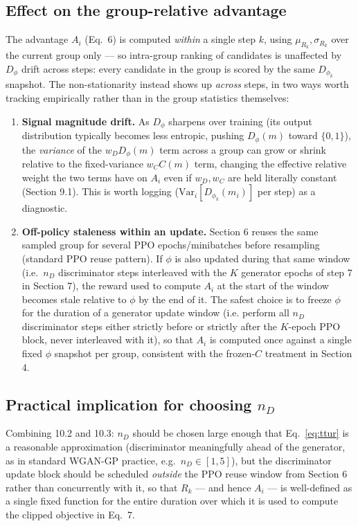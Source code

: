 \documentclass[11pt]{article}
\newcommand{\1}{\mathbb{1}}
\begin{document}
\subsection{Effect on the group-relative advantage}
The advantage $A_i$ (Eq.~6) is computed \emph{within} a single step
$k$, using $\mu_{R_k}, \sigma_{R_k}$ over the current group only ---
so intra-group ranking of candidates is unaffected by $D_\phi$ drift
across steps: every candidate in the group is scored by the same
$D_{\phi_k}$ snapshot. The non-stationarity instead shows up
\emph{across} steps, in two ways worth tracking empirically rather
than in the group statistics themselves:
\begin{enumerate}[nosep]
  \item \textbf{Signal magnitude drift.} As $D_\phi$ sharpens over
  training (its output distribution typically becomes less entropic,
  pushing $D_\phi(m)$ toward $\{0,1\}$), the \emph{variance} of the
  $w_D D_\phi(m)$ term across a group can grow or shrink relative to
  the fixed-variance $w_C C(m)$ term, changing the effective relative
  weight the two terms have on $A_i$ even if $w_D, w_C$ are held
  literally constant (Section 9.1). This is worth logging
  ($\mathrm{Var}_i[D_{\phi_k}(m_i)]$ per step) as a diagnostic.
  \item \textbf{Off-policy staleness within an update.} Section 6
  reuses the same sampled group for several PPO epochs/minibatches
  before resampling (standard PPO reuse pattern). If $\phi$ is also
  updated during that same window (i.e.\ $n_D$ discriminator steps
  interleaved with the $K$ generator epochs of step 7 in Section 7),
  the reward used to compute $A_i$ at the start of the window becomes
  stale relative to $\phi$ by the end of it. The safest choice is to
  freeze $\phi$ for the duration of a generator update window (i.e.
  perform all $n_D$ discriminator steps either strictly before or
  strictly after the $K$-epoch PPO block, never interleaved with it),
  so that $A_i$ is computed once against a single fixed $\phi$
  snapshot per group, consistent with the frozen-$C$ treatment in
  Section 4.
\end{enumerate}

\subsection{Practical implication for choosing $n_D$}
Combining 10.2 and 10.3: $n_D$ should be chosen large enough that
Eq.~\eqref{eq:ttur} is a reasonable approximation (discriminator
meaningfully ahead of the generator, as in standard WGAN-GP
practice, e.g.\ $n_D \in [1,5]$), but the discriminator update block
should be scheduled \emph{outside} the PPO reuse window from Section
6 rather than concurrently with it, so that $R_k$ --- and hence
$A_i$ --- is well-defined as a single fixed function for the entire
duration over which it is used to compute the clipped objective in
Eq.~7.
\end{document}
